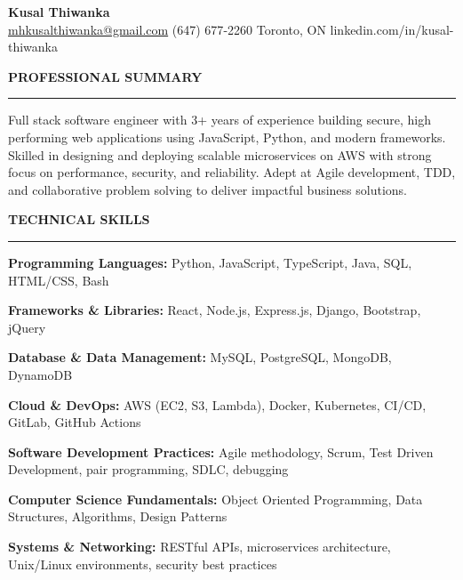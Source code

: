 \documentclass[10pt,letterpaper]{article}
\begin{document}
\begin{center}
{\LARGE\textbf{Kusal Thiwanka}}\\[1pt]
\href{mailto:mhkusalthiwanka@gmail.com}{mhkusalthiwanka@gmail.com}\hspace{2em}%
(647) 677{-}2260\hspace{2em}%
Toronto, ON\hspace{2em}
linkedin.com/in/kusal-thiwanka
\end{center}

\vspace{6pt}

\textbf{PROFESSIONAL SUMMARY}\\[-8pt]
\noindent\rule{\textwidth}{1pt}

\vspace{-2pt}

Full stack software engineer with 3+ years of experience building secure, high performing web applications using JavaScript, Python, and modern frameworks. Skilled in designing and deploying scalable microservices on AWS with strong focus on performance, security, and reliability. Adept at Agile development, TDD, and collaborative problem solving to deliver impactful business solutions.

\vspace{3pt}

\textbf{TECHNICAL SKILLS}\\[-8pt]
\noindent\rule{\textwidth}{1pt}

\vspace{-2pt}

\textbf{Programming Languages:} Python, JavaScript, TypeScript, Java, SQL, HTML/CSS, Bash

\textbf{Frameworks \& Libraries:} React, Node.js, Express.js, Django, Bootstrap, jQuery

\textbf{Database \& Data Management:} MySQL, PostgreSQL, MongoDB, DynamoDB

\textbf{Cloud \& DevOps:} AWS (EC2, S3, Lambda), Docker, Kubernetes, CI/CD, GitLab, GitHub Actions

\textbf{Software Development Practices:} Agile methodology, Scrum, Test Driven Development, pair programming, SDLC, debugging

\textbf{Computer Science Fundamentals:} Object Oriented Programming, Data Structures, Algorithms, Design Patterns

\textbf{Systems \& Networking:} RESTful APIs, microservices architecture, Unix/Linux environments, security best practices
\end{document}
